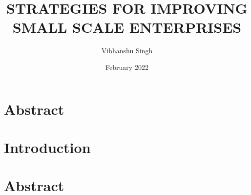 \documentclass{article}
\title{STRATEGIES FOR IMPROVING SMALL SCALE ENTERPRISES}
\author{Vibhanshu Singh}
\date{February 2022}
\begin{document}
\maketitle

\section{Abstract}
\section{Introduction}

\newpage

\section*{Abstract}
\newcommand\shortlorem{The study is aimed at the reappraising on the strategies for improving small scale enterprises. The study would help to identify some of the strategies for improving small scale enterprise. It will also help the future investors to be aware of the strategies to be encountered. However, the research question are based on the strategies for improving small scale enterprise, the roles of the government to play in improving small scale enterprises such as providing of basic infrastructural facilities, providing of adequate providing of adequate capital or finance. During the research necessary data was collected through the use of questionnaire and was analysed making use of tabulation method and simple percentage. During the course of the project the survey research method was the research method used. Moreover, the pilot survey was used for the sample size while simple random are used for the sampling technique i.e. thirty five out of forty of the staff were randomly selected. Also effort were made by the Researchers to collect the needed data and accurate information through the use of both primary and secondary sources of data. The data collected was analysed, interpreted and presented using tabulation method and simple percentage. Furthermore the researchers found out that lack of fund, inadequate planning, incompetence of management, poor competitive position are the problems facing small scale enterprises. Also they found out that the government, individual and other organization over the environment have a great role to play in the management of small scale establishment in our country. Finally the researchers recommended that appropriate credit guarantee schemes should be established and the support from credit bureau developed. They also recommended that Development of Infrastructure by the government should be provided to support small scale enterprises.}
\end{document}

